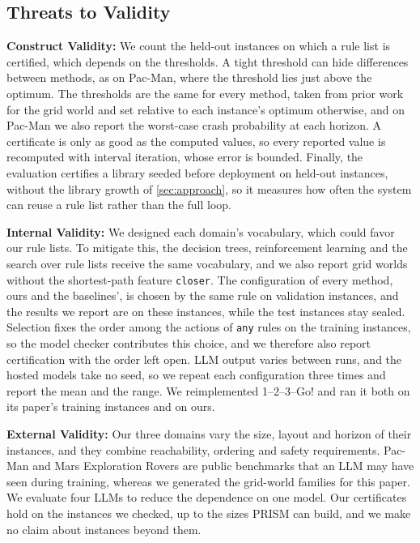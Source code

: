 
\subsection{Threats to Validity}
\label{sec:threats}

\textbf{Construct Validity:}
We count the held-out instances on which a rule list is certified, which depends on the thresholds.
A tight threshold can hide differences between methods, as on Pac-Man, where the threshold lies just above the optimum.
The thresholds are the same for every method, taken from prior work for the grid world and set relative to each instance's optimum otherwise, and on Pac-Man we also report the worst-case crash probability at each horizon.
A certificate is only as good as the computed values, so every reported value is recomputed with interval iteration, whose error is bounded.
Finally, the evaluation certifies a library seeded before deployment on held-out instances, without the library growth of \autoref{sec:approach}, so it measures how often the system can reuse a rule list rather than the full loop.

\textbf{Internal Validity:}
We designed each domain's vocabulary, which could favor our rule lists.
To mitigate this, the decision trees, reinforcement learning and the search over rule lists receive the same vocabulary, and we also report grid worlds without the shortest-path feature \texttt{closer}.
The configuration of every method, ours and the baselines', is chosen by the same rule on validation instances, and the results we report are on these instances, while the test instances stay sealed.
Selection fixes the order among the actions of \texttt{any} rules on the training instances, so the model checker contributes this choice, and we therefore also report certification with the order left open.
LLM output varies between runs, and the hosted models take no seed, so we repeat each configuration three times and report the mean and the range.
We reimplemented 1--2--3--Go! and ran it both on its paper's training instances and on ours.

\textbf{External Validity:}
Our three domains vary the size, layout and horizon of their instances, and they combine reachability, ordering and safety requirements.
Pac-Man and Mars Exploration Rovers are public benchmarks that an LLM may have seen during training, whereas we generated the grid-world families for this paper.
We evaluate four LLMs to reduce the dependence on one model.
Our certificates hold on the instances we checked, up to the sizes PRISM can build, and we make no claim about instances beyond them.
